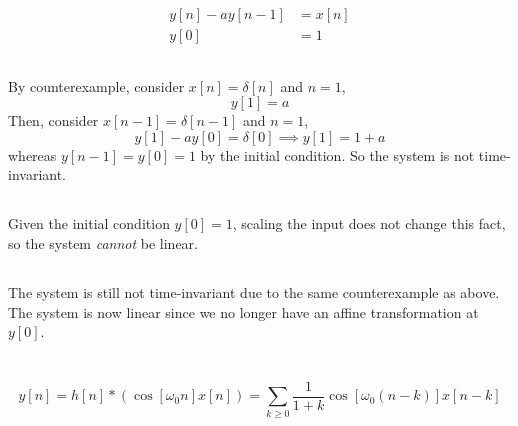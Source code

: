 \documentclass{article}
\begin{document}
\newpage
\section{}

\begin{align}
    y[n] - ay[n - 1] &= x[n] \\
    y[0] &= 1
\end{align}

\subsection{}

By counterexample, consider \(x[n] = \delta[n]\) and \(n = 1\),
\begin{equation}
    y[1] = a
\end{equation}
Then, consider \(x[n - 1] = \delta[n - 1]\) and \(n = 1\),
\begin{equation}
    y[1] - a y[0] = \delta[0] \implies y[1] = 1 + a
\end{equation}
whereas \(y[n - 1] = y[0] = 1\) by the initial condition.
So the system is not time-invariant.

\subsection{}

Given the initial condition \(y[0] = 1\), scaling the input does not change this fact, so the system \emph{cannot} be linear.

\subsection{}

The system is still not time-invariant due to the same counterexample as above.
The system is now linear since we no longer have an affine transformation at \(y[0]\).

\newpage
\section{}

\begin{equation}
    y[n] = h[n] \ast (\cos[\omega_0 n] x[n]) = \sum_{k \geqslant 0} \frac{1}{1 + k} \cos[\omega_0 (n - k)] x[n - k]
\end{equation}
\end{document}
